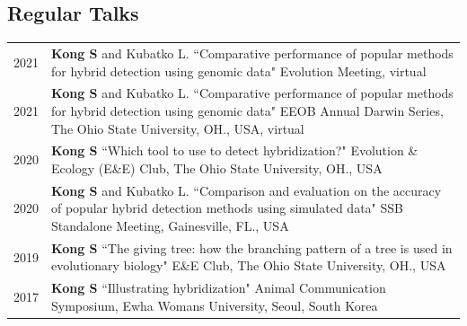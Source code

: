 \documentclass[11pt]{article}
\begin{document}
\subsection*{Regular Talks}
\begin{longtable}{p{}  p{}}
2021 & \textbf{Kong S} and Kubatko L.  ``Comparative performance of popular methods for hybrid detection using genomic data" Evolution Meeting, virtual \textit{} \vspace{5pt} \\ 
2021 & \textbf{Kong S} and Kubatko L.  ``Comparative performance of popular methods for hybrid detection using genomic data" EEOB Annual Darwin Series, The Ohio State University, OH., USA, virtual \vspace{5pt} \\ 
2020 & \textbf{Kong S} ``Which tool to use to detect hybridization?" Evolution \& Ecology (E\&E) Club, The Ohio State University, OH., USA \vspace{5pt} \\
2020 & \textbf{Kong S} and Kubatko L.  ``Comparison and evaluation on the accuracy of popular hybrid detection methods using simulated data" SSB Standalone Meeting, Gainesville, FL., USA \vspace{5pt} \\ 
2019 &  \textbf{Kong S} ``The giving tree: how the branching pattern of a tree is used in evolutionary biology" E\&E Club, The Ohio State University, OH., USA \vspace{5pt} \\  

2017 & \textbf{Kong S} ``Illustrating hybridization" Animal Communication Symposium, Ewha Womans University, Seoul, South Korea \vspace{5pt} \\  

\end{longtable}
\end{document}
